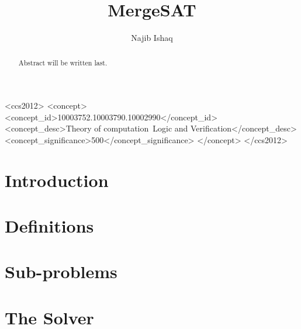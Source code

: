 \documentclass[sigchi,authordraft]{acmart}
\begin{document}
    \title{MergeSAT}

    \author{Najib Ishaq}

    \renewcommand{\shortauthors}{Najib}

    \begin{abstract}
        Abstract will be written last.
    \end{abstract}

    \begin{CCSXML}
        <ccs2012>
            <concept>
                <concept_id>10003752.10003790.10002990</concept_id>
                <concept_desc>Theory of computation~Logic and Verification</concept_desc>
                <concept_significance>500</concept_significance>
            </concept>
        </ccs2012>
\end{CCSXML}



    \maketitle

    \section{Introduction}
    \label{sec:introduction}
    

    \section{Definitions}
    \label{sec:definitions}
    

    \section{Sub-problems}
    \label{sec:sub-problems}
    

    \section{The Solver}
    \label{sec:the-solver}
    
\end{document}
